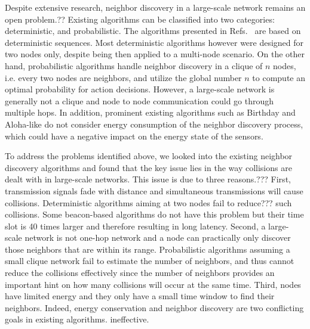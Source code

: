 Despite extensive research, neighbor discovery in a large-scale network
remains an open problem.??
Existing algorithms can be classified into two categories: deterministic, and probabilistic.
The algorithms presented in
Refs.~\cite{dutta2008practical, kandhalu2010u, bakht2012searchlight,
sun2014hello, chen2015heterogeneous, qiu2016talk} are %
based on deterministic sequences.
Most deterministic algorithms however were designed for two
nodes only, despite being then applied to a multi-node scenario.
On the other hand,
probabilistic algorithms handle neighbor discovery in a clique of $n$
nodes\cite{mcglynn2001birthday, vasudevan2009neighbor, you2011aloha,
song2014probabilistic}, i.e. every two nodes are neighbors, and utilize
the global number $n$ to compute an optimal probability for action
decisions. However, a large-scale network is generally not a clique and
node to node communication could go through multiple hops.
In addition, prominent existing
algorithms such as Birthday \cite{mcglynn2001birthday} and Aloha-like
\cite{vasudevan2009neighbor} do not consider energy consumption of the
neighbor discovery process, which could have a negative impact on the
energy state of the sensors.

To address the problems identified above, we looked into the existing
neighbor discovery algorithms and found that the key issue lies in the
way collisions are dealt with in large-scale networks.
This issue is due to three reasons.???
First, transmission signals fade with distance and simultaneous
transmissions will cause collisions. %
Deterministic algorithms aiming at two nodes \cite{kandhalu2010u,
chen2015heterogeneous} fail to reduce??? such collisions. Some beacon-based
algorithms \cite{dutta2008practical, bakht2012searchlight, sun2014hello,
qiu2016talk} do not have this problem but their time slot is 40 times
larger \cite{kandhalu2010u} and therefore resulting in long latency. 
Second, a large-scale network is not one-hop network and a node can
practically only discover those neighbors that are within its range.
Probabilistic algorithms
\cite{vasudevan2009neighbor, you2011aloha, song2014probabilistic}
assuming a small clique network fail to estimate the number of
neighbors, and thus cannot reduce the collisions effectively since the
number of neighbors provides an important hint on how many collisions
will occur at the same time.
Third, nodes have limited energy and they only have a small time window
to find their neighbors. Indeed, energy conservation and
neighbor discovery are two conflicting goals in existing algorithms.
ineffective.


